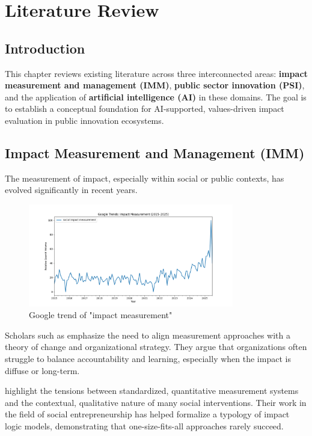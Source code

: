 \chapter{Literature Review}\label{ch:literature-review}


\section{Introduction}\label{sec:introduction}

This chapter reviews existing literature across three interconnected areas: \textbf{impact measurement and management (IMM)}, \textbf{public sector innovation (PSI)}, and the application of \textbf{artificial intelligence (AI)} in these domains.
The goal is to establish a conceptual foundation for AI-supported, values-driven impact evaluation in public innovation ecosystems.

\section{Impact Measurement and Management (IMM)}\label{sec:impact-measurement-and-management-imm}

The measurement of impact, especially within social or public contexts, has evolved significantly in recent years.

\begin{figure}[H]
    \centering
    \includegraphics[width = 0.8\textwidth]{../fig/google_trend_impact}
    \caption{Google trend of "impact measurement"}
    \label{fig:trend_impact}
\end{figure}

Scholars such as \textcite{ebrahim2014measuring} emphasize the need to align measurement approaches with a theory of change and organizational strategy.
They argue that organizations often struggle to balance accountability and learning, especially when the impact is diffuse or long-term.


\textcite{nicholls2012measuring} highlight the tensions between standardized, quantitative measurement systems and the contextual, qualitative nature of many social interventions.
Their work in the field of social entrepreneurship has helped formalize a typology of impact logic models, demonstrating that one-size-fits-all approaches rarely succeed.

